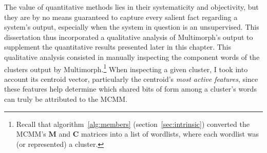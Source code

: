
The value of quantitative methods lies in their systematicity and objectivity, but
they are by no means guaranteed to capture every salient fact regarding a system's output,
especially when the system in question is an unsupervised. 
 This dissertation thus incorporated a qualitative analysis of Multimorph's output to supplement the  
quantitative results presented later in this chapter.
This qualitative analysis consisted in manually inspecting the component words of the clusters 
output by Multimorph.\footnote{Recall that
algorithm~\ref{alg:members} (section~\ref{sec:intrinsic}) converted the MCMM's $\mathbf{M}$ and $\mathbf{C}$
matrices into a list of wordlists, where each wordlist was (or represented) a cluster.} 
When inspecting a given cluster, I took into account its centroid vector, particularly the centroid's \emph{most active
features}, since these features help determine which shared bits of form among a cluster's words can truly be attributed to the MCMM. 
%

